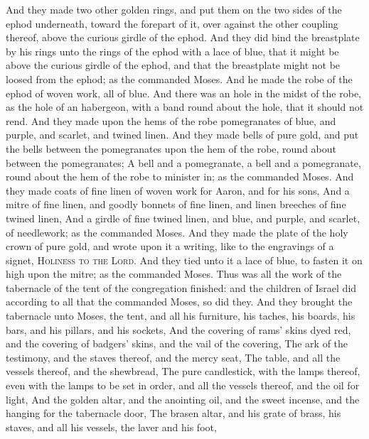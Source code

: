 \begin{biblechapter}
\verse And they made two other golden rings, and put them on the two sides of the ephod underneath, toward the forepart of it, over against the other coupling thereof, above the curious girdle of the ephod.
\verse And they did bind the breastplate by his rings unto the rings of the ephod with a lace of blue, that it might be above the curious girdle of the ephod, and that the breastplate might not be loosed from the ephod; as the \LORD commanded Moses.
 And he made the robe of the ephod of woven work, all of blue.
\verse And there was an hole in the midst of the robe, as the hole of an habergeon, with a band round about the hole, that it should not rend.
\verse And they made upon the hems of the robe pomegranates of blue, and purple, and scarlet, and twined linen.
\verse And they made bells of pure gold, and put the bells between the pomegranates upon the hem of the robe, round about between the pomegranates;
\verse A bell and a pomegranate, a bell and a pomegranate, round about the hem of the robe to minister in; as the \LORD commanded Moses.
\verse And they made coats of fine linen of woven work for Aaron, and for his sons,
\verse And a mitre of fine linen, and goodly bonnets of fine linen, and linen breeches of fine twined linen,
\verse And a girdle of fine twined linen, and blue, and purple, and scarlet, of needlework; as the \LORD commanded Moses.
\verse And they made the plate of the holy crown of pure gold, and wrote upon it a writing, like to the engravings of a signet, \textsc{Holiness to the Lord}.
\verse And they tied unto it a lace of blue, to fasten it on high upon the mitre; as the \LORD commanded Moses.
 Thus was all the work of the tabernacle of the tent of the congregation finished: and the children of Israel did according to all that the \LORD commanded Moses, so did they.
\verse And they brought the tabernacle unto Moses, the tent, and all his furniture, his taches, his boards, his bars, and his pillars, and his sockets,
\verse And the covering of rams' skins dyed red, and the covering of badgers' skins, and the vail of the covering,
\verse The ark of the testimony, and the staves thereof, and the mercy seat,
\verse The table, and all the vessels thereof, and the shewbread,
\verse The pure candlestick, with the lamps thereof, even with the lamps to be set in order, and all the vessels thereof, and the oil for light,
\verse And the golden altar, and the anointing oil, and the sweet incense, and the hanging for the tabernacle door,
\verse The brasen altar, and his grate of brass, his staves, and all his vessels, the laver and his foot,

\end{biblechapter}
